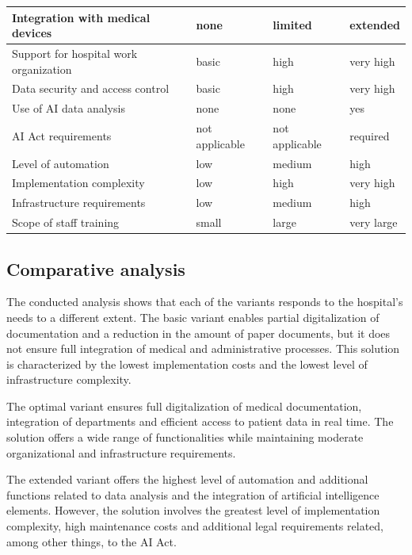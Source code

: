\begin{longtable}{|p{4cm}|p{3cm}|p{3cm}|p{3cm}|}
Integration with medical devices &
none &
limited &
extended \\
\hline

Support for hospital work organization &
basic &
high &
very high \\
\hline

Data security and access control &
basic &
high &
very high \\
\hline

Use of AI data analysis &
none &
none &
yes \\
\hline

AI Act requirements &
not applicable &
not applicable &
required \\
\hline

Level of automation &
low &
medium &
high \\
\hline

Implementation complexity &
low &
high &
very high \\
\hline

Infrastructure requirements &
low &
medium &
high \\
\hline

Scope of staff training &
small &
large &
very large \\
\hline

\end{longtable}

\subsection{Comparative analysis}

The conducted analysis shows that each of the variants responds to the hospital's needs to a different extent. The basic variant enables partial digitalization of documentation and a reduction in the amount of paper documents, but it does not ensure full integration of medical and administrative processes. This solution is characterized by the lowest implementation costs and the lowest level of infrastructure complexity.

The optimal variant ensures full digitalization of medical documentation, integration of departments and efficient access to patient data in real time. The solution offers a wide range of functionalities while maintaining moderate organizational and infrastructure requirements.

The extended variant offers the highest level of automation and additional functions related to data analysis and the integration of artificial intelligence elements. However, the solution involves the greatest level of implementation complexity, high maintenance costs and additional legal requirements related, among other things, to the AI Act.

